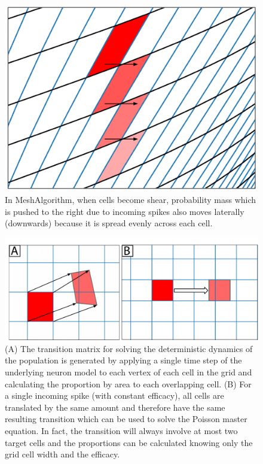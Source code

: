 \documentclass[utf8]{frontiersSCNS} %
\begin{document}
\begin{figure}[!htb]
  \centering
  \includegraphics[width=0.6\columnwidth]{images/mesh_issue_arrow.pdf}
  \caption{In MeshAlgorithm, when cells become shear, probability mass which is pushed to the right due to incoming spikes also moves laterally (downwards) because it is spread evenly across each cell.}
  \label{fig:meshissue}
\end{figure}

\begin{figure}[!htb]
  \centering
  \includegraphics[width=\columnwidth]{images/grid_transitions.pdf}
  \caption{(A) The transition matrix for solving the deterministic dynamics of the population is generated by applying a single time step of the underlying neuron model to each vertex of each cell in the grid and calculating the proportion by area to each overlapping cell. (B) For a single incoming spike (with constant efficacy), all cells are translated by the same amount and therefore have the same resulting transition which can be used to solve the Poisson master equation. In fact, the transition will always involve at most two target cells and the proportions can be calculated knowing only the grid cell width and the efficacy.}
  \label{fig:grid}
\end{figure}
\end{document}
